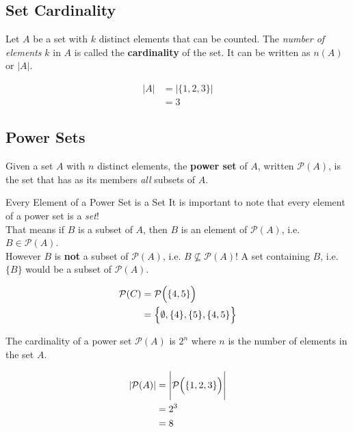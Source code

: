 \documentclass[../notes.tex]{subfiles}
\begin{document}
      \subsection{Set Cardinality}
        Let $A$ be a set with $k$ distinct elements that can be counted. The \textit{number of elements} $k$ in $A$ is called the \textbf{cardinality} of the set. It can be written as $n(A)$ or $\left\lvert A\right\rvert$.
        \begin{examplebox}
          \begin{align*}
            \left\lvert A\right\rvert &= \left\lvert \{1, 2, 3\}\right\rvert\\
            &= 3
          \end{align*}
        \end{examplebox}
      \subsection{Power Sets}
        Given a set $A$ with $n$ distinct elements, the \textbf{power set} of $A$, written $\mathcal{P}(A)$, is the set that has as its members \textit{all} subsets of $A$.

        \begin{notebox}{Every Element of a Power Set is a Set}
          It is important to note that every element of a power set is a \textit{set}!\\ That means if $B$ is a subset of $A$, then $B$ is an element of $\mathcal{P}(A)$, i.e. $B \in \mathcal{P}(A)$.\\
          However $B$ is \textbf{not} a subset of $\mathcal{P}(A)$, i.e. $B \nsubseteq \mathcal{P}(A)$! A set containing $B$, i.e. $\{B\}$ would be a subset of $\mathcal{P}(A)$.
        \end{notebox}
      \begin{examplebox}
        \begin{align*}
          \mathcal{P}(C) &= \mathcal{P}\Bigl(\{4, 5\}\Bigr)\\
          &= \Bigl\{\emptyset, \{4\}, \{5\}, \{4, 5\}\Bigr\}
        \end{align*}
      \end{examplebox}
      The cardinality of a power set $\mathcal{P}(A)$ is $2^{n}$ where $n$ is the number of elements in the set $A$.
      \begin{examplebox}
        \begin{align*}
          \left\lvert \mathcal{P}(A)\right\rvert &= \Biggl|\mathcal{P}\Bigl(\{1, 2, 3\}\Bigr)\Biggr|\\
          &= 2^{3}\\
          &= 8
        \end{align*}
      \end{examplebox}
\end{document}
